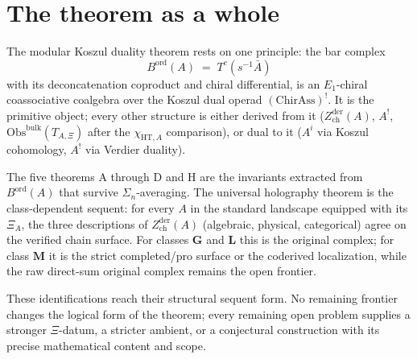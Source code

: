 \section{The theorem as a whole}
\label{sec:programme-whole}

The modular Koszul duality theorem rests on one principle: the
bar complex
\[
 B^{\mathrm{ord}}(A) \;=\; T^{c}(s^{-1} \bar{A})
\]
with its deconcatenation coproduct and chiral differential, is an
$E_{1}$-chiral coassociative coalgebra over the Koszul dual
operad $(\mathrm{ChirAss})^{!}$. It is the primitive object; every
other structure is either derived from it
($Z^{\mathrm{der}}_{\mathrm{ch}}(A)$, $A^{!}$,
\(\mathrm{Obs}^{\mathrm{bulk}}(T_{A,\Xi})\) after the
\(\chi_{\mathrm{HT},A}\) comparison), or dual to it ($A^{i}$ via
Koszul cohomology, $A^{!}$ via Verdier duality).

The five theorems A through D and H are the
invariants extracted from $B^{\mathrm{ord}}(A)$ that survive
$\Sigma_{n}$-averaging. The universal holography theorem is the
class-dependent sequent: for every \(A\) in the standard landscape
equipped with its \(\Xi_A\), the three descriptions of
$Z^{\mathrm{der}}_{\mathrm{ch}}(A)$ (algebraic, physical,
categorical) agree on the verified chain surface. For classes
$\mathbf G$ and $\mathbf L$ this is the original complex; for class
$\mathbf M$ it is the strict completed/pro surface or the coderived
localization, while the raw direct-sum original complex remains the
open frontier.

These identifications reach their structural sequent form. No
remaining frontier changes the logical form of the theorem; every
remaining open problem supplies a stronger \(\Xi\)-datum, a stricter
ambient, or a conjectural construction with its precise mathematical
content and scope.

